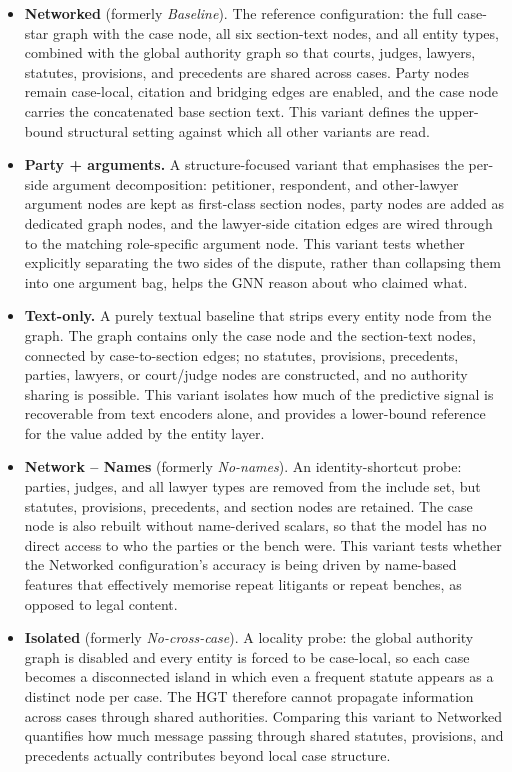 \documentclass[runningheads]{llncs}
\begin{document}
\begin{itemize}[leftmargin=*]
    \item \textbf{Networked} (formerly \emph{Baseline}). The reference configuration: the full case-star graph with the case node, all six section-text nodes, and all entity types, combined with the global authority graph so that courts, judges, lawyers, statutes, provisions, and precedents are shared across cases. Party nodes remain case-local, citation and bridging edges are enabled, and the case node carries the concatenated base section text. This variant defines the upper-bound structural setting against which all other variants are read.

    \item \textbf{Party + arguments.} A structure-focused variant that emphasises the per-side argument decomposition: petitioner, respondent, and other-lawyer argument nodes are kept as first-class section nodes, party nodes are added as dedicated graph nodes, and the lawyer-side citation edges are wired through to the matching role-specific argument node. This variant tests whether explicitly separating the two sides of the dispute, rather than collapsing them into one argument bag, helps the GNN reason about who claimed what.

    \item \textbf{Text-only.} A purely textual baseline that strips every entity node from the graph. The graph contains only the case node and the section-text nodes, connected by case-to-section edges; no statutes, provisions, precedents, parties, lawyers, or court/judge nodes are constructed, and no authority sharing is possible. This variant isolates how much of the predictive signal is recoverable from text encoders alone, and provides a lower-bound reference for the value added by the entity layer.

    \item \textbf{Network -- Names} (formerly \emph{No-names}). An identity-shortcut probe: parties, judges, and all lawyer types are removed from the include set, but statutes, provisions, precedents, and section nodes are retained. The case node is also rebuilt without name-derived scalars, so that the model has no direct access to who the parties or the bench were. This variant tests whether the Networked configuration's accuracy is being driven by name-based features that effectively memorise repeat litigants or repeat benches, as opposed to legal content.

    \item \textbf{Isolated} (formerly \emph{No-cross-case}). A locality probe: the global authority graph is disabled and every entity is forced to be case-local, so each case becomes a disconnected island in which even a frequent statute appears as a distinct node per case. The HGT therefore cannot propagate information across cases through shared authorities. Comparing this variant to Networked quantifies how much message passing through shared statutes, provisions, and precedents actually contributes beyond local case structure.


\end{itemize}
\end{document}
